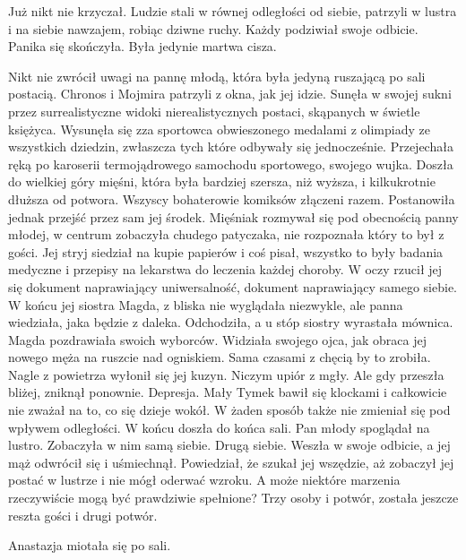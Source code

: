 \divider{}

Już nikt nie krzyczał. 
Ludzie stali w równej odległości od siebie, patrzyli w lustra i na siebie nawzajem, robiąc dziwne ruchy.
Każdy podziwiał swoje odbicie. Panika się skończyła. Była jedynie martwa cisza.

Nikt nie zwrócił uwagi na pannę młodą, która była jedyną ruszającą po sali postacią. Chronos i Mojmira patrzyli z okna, jak jej idzie.
Sunęła w swojej sukni przez surrealistyczne widoki nierealistycznych postaci, skąpanych w świetle księżyca.
Wysunęła się zza sportowca obwieszonego medalami z olimpiady ze wszystkich dziedzin, zwłaszcza tych które odbywały się jednocześnie.
Przejechała ręką po karoserii termojądrowego samochodu sportowego, swojego wujka.
Doszła do wielkiej góry mięśni, która była bardziej szersza, niż wyższa, i kilkukrotnie dłuższa od potwora. Wszyscy bohaterowie komiksów złączeni razem.
Postanowiła jednak przejść przez sam jej środek. Mięśniak rozmywał się pod obecnością panny młodej, w centrum zobaczyła chudego patyczaka, nie rozpoznała który to był z gości.
Jej stryj siedział na kupie papierów i coś pisał, wszystko to były badania medyczne i przepisy na lekarstwa do leczenia każdej choroby.
W oczy rzucił jej się dokument naprawiający uniwersalność, dokument naprawiający samego siebie.
W końcu jej siostra Magda, z bliska nie wyglądała niezwykle, ale panna wiedziała, jaka będzie z daleka. 
Odchodziła, a u stóp siostry wyrastała mównica. Magda pozdrawiała swoich wyborców.
Widziała swojego ojca, jak obraca jej nowego męża na ruszcie nad ogniskiem. Sama czasami z chęcią by to zrobiła.
Nagle z powietrza wyłonił się jej kuzyn. Niczym upiór z mgły.
Ale gdy przeszła bliżej, zniknął ponownie. Depresja.
Mały Tymek bawił się klockami i całkowicie nie zważał na to, co się dzieje wokół. 
W żaden sposób także nie zmieniał się pod wpływem odległości.
W końcu doszła do końca sali. Pan młody spoglądał na lustro. Zobaczyła w nim samą siebie. Drugą siebie.
Weszła w swoje odbicie, a jej mąż odwrócił się i uśmiechnął. Powiedział, że szukał jej wszędzie, aż zobaczył jej postać w lustrze i nie mógł oderwać wzroku.
A może niektóre marzenia rzeczywiście mogą być prawdziwie spełnione?
Trzy osoby i potwór, została jeszcze reszta gości i drugi potwór.

Anastazja miotała się po sali.

